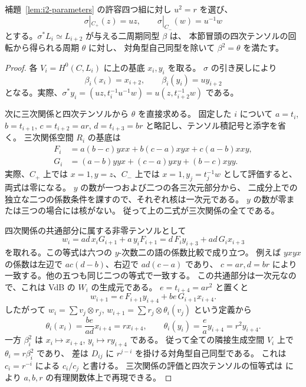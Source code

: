 \begin{proposition}[二周期の平方の直接計算]
\label{prop:i2-period-square}
補題~\ref{lem:i2-parameters} の許容四つ組に対し $u^2=r$ を選び、
\[
 \sigma|_{C_+}(z)=uz,\qquad
 \sigma|_{C_-}(w)=u^{-1}w
\]
とする。$\sigma^*L_i\simeq L_{i+2}$ が与える二周期同型 $\beta$ は、
本節冒頭の四次テンソルの回転から得られる周期 $\theta$ に対し、
対角型自己同型を除いて $\beta^2=\theta$ を満たす。
\end{proposition}

\begin{proof}
各 $V_i=H^0(C,L_i)$ に上の基底 $x_i,y_i$ を取る。
$\sigma$ の引き戻しにより
\[
 \beta_i(x_i)=x_{i+2},\qquad
 \beta_i(y_i)=u y_{i+2}
\]
となる。実際、$\sigma^*y_i=(uz,t_i^{-1}u^{-1}w)
=u(z,t_{i+2}^{-1}w)$ である。

次に三次関係と四次テンソルから $\theta$ を直接求める。
固定した $i$ について $a=t_i$, $b=t_{i+1}$, $c=t_{i+2}=ar$,
$d=t_{i+3}=br$ と略記し、テンソル積記号と添字を省く。
三次関係空間 $R_i$ の基底は
\begin{align*}
 F_i&=a(b-c)yxx+b(c-a)xyx+c(a-b)xxy,\\
 G_i&=(a-b)yyx+(c-a)yxy+(b-c)xyy.
\end{align*}
実際、$C_+$ 上では $x=1,y=z$、$C_-$ 上では
$x=1,y_j=t_j^{-1}w$ として評価すると、両式は零になる。
$y$ の数が一つおよび二つの各三次元部分から、
二成分上での独立な二つの係数条件を課すので、それぞれ核は一次元である。
$y$ の数が零または三つの場合には核がない。
従って上の二式が三次関係の全てである。

四次関係の共通部分に属する非零テンソルとして
\[
 w_i=ad\,x_iG_{i+1}+a\,y_iF_{i+1}
     =d\,F_i y_{i+3}+ad\,G_i x_{i+3}
\]
を取れる。この等式は六つの $y$-次数二の語の係数比較で成り立つ。
例えば $yxyx$ の係数は左辺で $ac(d-b)$、右辺で $ad(c-a)$ であり、
$c=ar,d=br$ により一致する。他の五つも同じ二つの等式で一致する。
この共通部分は一次元なので、これは VdB の $W_i$ の生成元である。
$e=t_{i+4}=ar^2$ と置くと
\[
 w_{i+1}=e\,F_{i+1}y_{i+4}+be\,G_{i+1}x_{i+4}.
\]
したがって $w_i=\sum v_j\otimes r_j$,
$w_{i+1}=\sum r_j\otimes\theta_i(v_j)$ という定義から
\[
 \theta_i(x_i)=\frac{be}{ad}x_{i+4}=r x_{i+4},\qquad
 \theta_i(y_i)=\frac ea y_{i+4}=r^2 y_{i+4}.
\]
一方 $\beta^2_i$ は $x_i\mapsto x_{i+4}$,
$y_i\mapsto r y_{i+4}$ である。
従って全ての隣接生成空間 $V_i$ 上で $\theta_i=r\beta_i^2$ であり、
差は $D_{ij}$ に $r^{j-i}$ を掛ける対角型自己同型である。
これは $c_i=r^{-i}$ による $c_i/c_j$ と書ける。
三次関係の評価と四次テンソルの恒等式は
 により
$a,b,r$ の有理関数体上で再現できる。
\end{proof}

